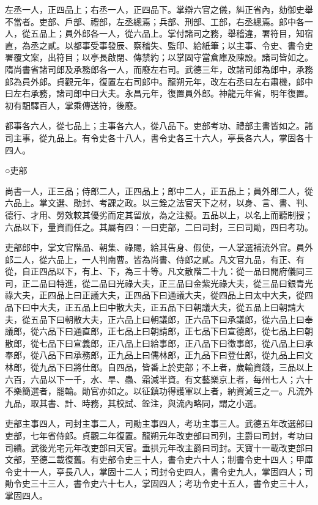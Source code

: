 \begin{pinyinscope}
 左丞一人，正四品上；右丞一人，正四品下。掌辯六官之儀，糾正省內，劾御史舉不當者。吏部、戶部、禮部，左丞總焉；兵部、刑部、工部，右丞總焉。郎中各一人，從五品上；員外郎各一人，從六品上。掌付諸司之務，舉稽違，署符目，知宿直，為丞之貳。以都事受事發辰、察稽失、監印、給紙筆；以主事、令史、書令史署覆文案，出符目；以亭長啟閉、傳禁約；以掌固守當倉庫及陳設。諸司皆如之。隋尚書省諸司郎及承務郎各一人，而廢左右司。武德三年，改諸司郎為郎中，承務郎為員外郎。貞觀元年，復置左右司郎中。龍朔元年，改左右丞曰左右肅機，郎中曰左右承務，諸司郎中曰大夫。永昌元年，復置員外郎。神龍元年省，明年復置。初有馹驛百人，掌乘傳送符，後廢。



 都事各六人，從七品上；主事各六人，從八品下。吏部考功、禮部主書皆如之。諸司主事，從九品上。有令史各十八人，書令史各三十六人，亭長各六人，掌固各十四人。



 ○吏部



 尚書一人，正三品；侍郎二人，正四品上；郎中二人，正五品上；員外郎二人，從六品上。掌文選、勛封、考課之政。以三銓之法官天下之材，以身、言、書、判、德行、才用、勞效較其優劣而定其留放，為之注擬。五品以上，以名上而聽制授；六品以下，量資而任之。其屬有四：一曰吏部，二曰司封，三曰司勛，四曰考功。



 吏部郎中，掌文官階品、朝集、祿賜，給其告身、假使，一人掌選補流外官。員外郎二人，從六品上，一人判南曹。皆為尚書、侍郎之貳。凡文官九品，有正、有從，自正四品以下，有上、下，為三十等。凡文散階二十九：從一品曰開府儀同三司，正二品曰特進，從二品曰光祿大夫，正三品曰金紫光祿大夫，從三品曰銀青光祿大夫，正四品上曰正議大夫，正四品下曰通議大夫，從四品上曰太中大夫，從四品下曰中大夫，正五品上曰中散大夫，正五品下曰朝議大夫，從五品上曰朝請大夫，從五品下曰朝散大夫，正六品上曰朝議郎，正六品下曰承議郎，從六品上曰奉議郎，從六品下曰通直郎，正七品上曰朝請郎，正七品下曰宣德郎，從七品上曰朝散郎，從七品下曰宣義郎，正八品上曰給事郎，正八品下曰徵事郎，從八品上曰承奉郎，從八品下曰承務郎，正九品上曰儒林郎，正九品下曰登仕郎，從九品上曰文林郎，從九品下曰將仕郎。自四品，皆番上於吏部；不上者，歲輸資錢，三品以上六百，六品以下一千，水、旱、蟲、霜減半資。有文藝樂京上者，每州七人；六十不樂簡選者，罷輸。勛官亦如之。以征鎮功得護軍以上者，納資減三之一。凡流外九品，取其書、計、時務，其校試、銓注，與流內略同，謂之小選。



 吏部主事四人，司封主事二人，司勛主事四人，考功主事三人。武德五年改選部曰吏部，七年省侍郎。貞觀二年復置。龍朔元年改吏部曰司列，主爵曰司封，考功曰司績。武後光宅元年改吏部曰天官。垂拱元年改主爵曰司封。天寶十一載改吏部曰文部，至德二載復舊。有吏部令史三十人，書令史六十人；制書令史十四人；甲庫令史十一人，亭長八人，掌固十二人；司封令史四人，書令史九人，掌固四人；司勛令史三十三人，書令史六十七人，掌固四人；考功令史十五人，書令史三十人，掌固四人。




\end{pinyinscope}
